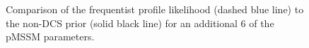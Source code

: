 \begin{figure}[htbp]
{}
\hspace{2mm}
\hspace{2mm}
\caption{Comparison of the frequentist profile likelihood (dashed blue line) to the non-DCS prior (solid black line) for an additional 6 of the pMSSM parameters. }
\label{fig:PandP2}
\end{figure}

\FloatBarrier

